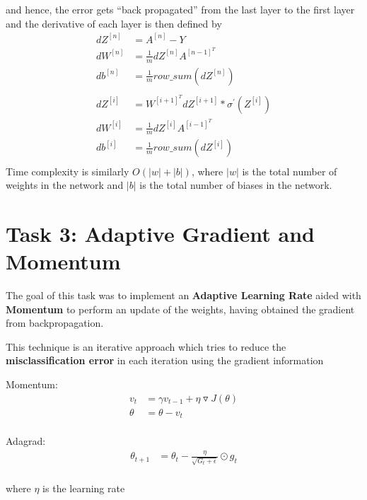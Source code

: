 \documentclass{article}
\begin{document}
\begin{enumerate}
	      and hence, the error gets “back propagated” from the last layer to the first layer and the derivative of each layer is then defined by
	      \begin{align*}
	      	dZ^{[n]} & = A^{[n]} - Y                                 \\
	      	dW^{[n]} & = \frac{1}{m}dZ^{[n]}A^{[n-1]^T}              \\
	      	db^{[n]} & = \frac{1}{m}row\_sum(dZ^{[n]})               \\ \\
	      	dZ^{[i]} & = W^{[i+1]^T}dZ^{[i+1]} * \sigma^{'}(Z^{[i]}) \\
	      	dW^{[i]} & = \frac{1}{m}dZ^{[i]}A^{[i-1]^T}              \\
	      	db^{[i]} & = \frac{1}{m}row\_sum(dZ^{[i]})               \\
	      \end{align*}
	      Time complexity is similarly $O(|w|+|b|)$, where $|w|$ is the total number of weights in the network and $|b|$ is the total number of 
	      biases in the network.
	      	      	      	      	      	      
\end{enumerate}

\section{Task 3: Adaptive Gradient and Momentum}
The goal of this task was to implement an \textbf{Adaptive Learning Rate} aided with \textbf{Momentum} to perform an update of the weights, having 
obtained the gradient from backpropagation.

This technique is an iterative approach which tries to reduce the \textbf{misclassification error} in each iteration using the gradient information

Momentum:
\begin{align*}
	v_t    & = \gamma v_{t-1} + \eta \triangledown J(\theta) \\
	\theta & = \theta - v_t                                  \\
\end{align*}

Adagrad:
\begin{align*}
	\theta_{t+1} & = \theta_{t} - \displaystyle \frac{\eta}{\sqrt{G_t+\epsilon}} \odot g_t \\
\end{align*}

where $\eta$ is the learning rate
\end{document}
